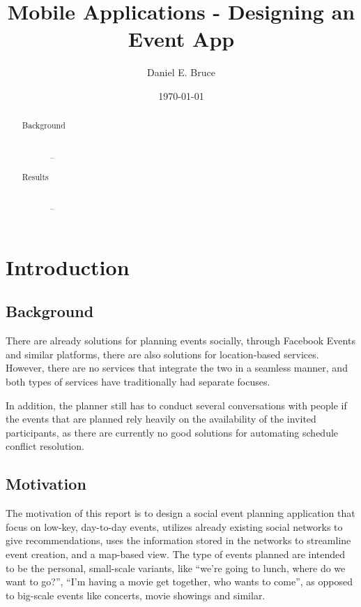 \documentclass[]{report}
\begin{document}
\title{Mobile Applications - Designing an Event App}
\author{Daniel E. Bruce}
\date{\today}
\maketitle

\begin{abstract}
  \begin{description}
    \item[Background] \hfill \\
      --
    \item[Results] \hfill \\
      --
  \end{description}
\end{abstract}

\tableofcontents

\chapter{Introduction}

\section{Background}

There are already solutions for planning events socially, through Facebook
Events and similar platforms, there are also solutions for location-based
services. However, there are no services that integrate the two in a seamless
manner, and both types of services have traditionally had separate focuses.

In addition, the planner still has to conduct several conversations with people
if the events that are planned rely heavily on the availability of the invited
participants, as there are currently no good solutions for automating schedule
conflict resolution.

\section{Motivation}

The motivation of this report is to design a social event planning application
that focus on low-key, day-to-day events, utilizes already existing social
networks to give recommendations, uses the information stored in the networks to
streamline event creation, and a map-based view. The type of events planned are
intended to be the personal, small-scale variants, like ``we're going to lunch,
where do we want to go?'', ``I'm having a movie get together, who wants to
come'', as opposed to big-scale events like concerts, movie showings and
similar.
\end{document}
